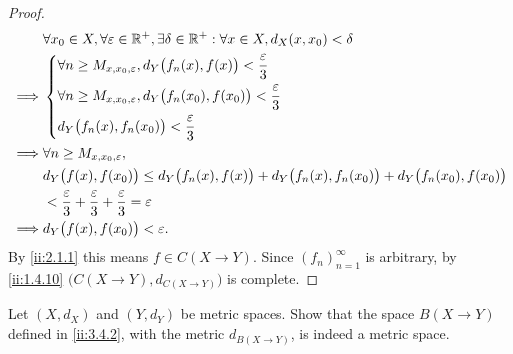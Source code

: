 \begin{proof}
  \begin{align*}
             & \forall x_0 \in X, \forall \varepsilon \in \mathbb{R}^+, \exists \delta \in \mathbb{R}^+ : \forall x \in X, d_X(x, x_0) < \delta         \\
    \implies & \begin{dcases}
                 \forall n \geq M_{x, x_0, \varepsilon}, d_Y\big(f_n(x), f(x)\big) < \dfrac{\varepsilon}{3}     \\
                 \forall n \geq M_{x, x_0, \varepsilon}, d_Y\big(f_n(x_0), f(x_0)\big) < \dfrac{\varepsilon}{3} \\
                 d_Y\big(f_n(x), f_n(x_0)\big) < \dfrac{\varepsilon}{3}
               \end{dcases}                           \\
    \implies & \forall n \geq M_{x, x_0, \varepsilon},                                                                                  \\
             & d_Y\big(f(x), f(x_0)\big) \leq d_Y\big(f_n(x), f(x)\big) + d_Y\big(f_n(x), f_n(x_0)\big) + d_Y\big(f_n(x_0), f(x_0)\big) \\
             & < \dfrac{\varepsilon}{3} + \dfrac{\varepsilon}{3} + \dfrac{\varepsilon}{3} = \varepsilon                                 \\
    \implies & d_Y\big(f(x), f(x_0)\big) < \varepsilon.
  \end{align*}
  By \cref{ii:2.1.1} this means \(f \in C(X \to Y)\).
  Since \((f_n)_{n = 1}^\infty\) is arbitrary, by \cref{ii:1.4.10} \(\big(C(X \to Y), d_{C(X \to Y)}\big)\) is complete.
\end{proof}

\exercisesection

\begin{ex}\label{ii:ex:3.4.1}
  Let \((X, d_X)\) and \((Y, d_Y)\) be metric spaces.
  Show that the space \(B(X \to Y)\) defined in \cref{ii:3.4.2}, with the metric \(d_{B(X \to Y)}\), is indeed a metric space.
\end{ex}

